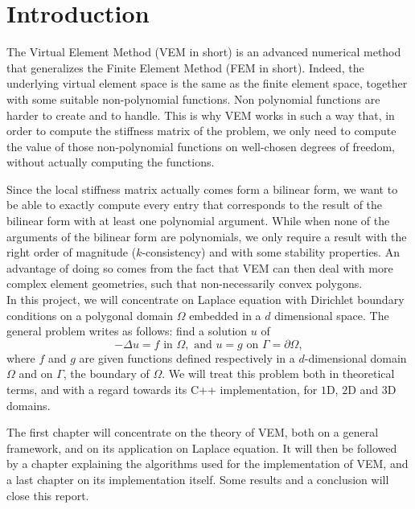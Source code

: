 \newpage
\section*{Introduction} 

The Virtual Element Method (VEM in short) is an advanced numerical method that generalizes the Finite Element Method (FEM in short). Indeed, the underlying virtual element space is the same as the finite element space, together with some suitable non-polynomial functions. Non polynomial functions are harder to create and to handle. This is why VEM works in such a way that, in order to compute the stiffness matrix of the problem, we only need to compute the value of those non-polynomial functions on well-chosen degrees of freedom, without actually computing the functions. 

Since the local stiffness matrix actually comes form a bilinear form, we want to be able to exactly compute every entry that corresponds to the result of the bilinear form with at least one polynomial argument. While when none of the arguments of the bilinear form are polynomials, we only require a result with the right order of magnitude ($k$-consistency) and with some stability properties. An advantage of doing so comes from the fact that VEM can then deal with more complex element geometries, such that non-necessarily convex polygons.\\

In this project, we will concentrate on Laplace equation with Dirichlet boundary conditions on a polygonal domain $\Omega$ embedded in a $d$ dimensional space. The general problem writes as follows: find a solution $u$ of
$$ -\Delta u = f \text{ in } \Omega, \text{ and } u = g \text{ on } \Gamma = \partial \Omega, $$
where $f$ and $g$ are given functions defined respectively in a $d$-dimensional domain $\Omega$ and on $\Gamma$, the boundary of $\Omega$.
We will treat this problem both in theoretical terms, and with a regard towards its C++ implementation, for $1$D, $2$D and $3$D domains. \newline

The first chapter will concentrate on the theory of VEM, both on a general framework, and on its application on Laplace equation. It will then be followed by a chapter explaining the algorithms used for the implementation of VEM, and a last chapter on its implementation itself. Some results and a conclusion will close this report. 



